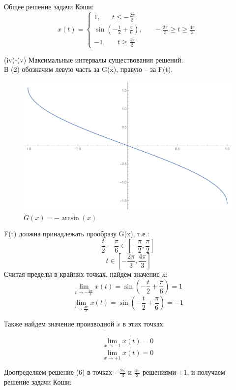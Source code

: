 \documentclass[a4paper, 12pt]{article}
\begin{document}
Общее решение задачи Коши:
\begin{equation*}
x(t) = 
 \begin{cases}
    1, \;\;\;\;\;\; t\leq -\frac{2\pi}3\\
   \sin( -\frac t 2 + \frac {\pi}{6}), \;\;\;\;\;\;  -\frac{2\pi}3 \geq  t\geq \frac{4\pi}3\\
   -1, \;\;\;\;\;\; t\geq \frac{4\pi}3
 \end{cases}
\end{equation*}



(iv)-(v) Максимальные интервалы существования решений.\\
В (2) обозначим левую часть за G(x), правую -- за F(t).
 
\begin{figure}[H]
	\centering
	\includegraphics[scale=0.6]{6}
	\caption{$G(x)=-\arcsin(x)$}
\end{figure}
F(t) должна принадлежать прообразу G(x), т.е.:
\[\frac t 2 - \frac{\pi} 6 \in \left[-\frac{\pi} 2 , \frac{\pi} 2  \right] \]
\[\ t  \in \left[-\frac{2\pi}3 , \frac{4\pi} 3  \right] \]
Считая пределы в крайних точках, найдем значение x:
\[\lim_{t \rightarrow -\frac{2\pi}3} x(t) = \sin\left( -\frac t 2 + \frac {\pi}{6}\right) = 1\]
\[\lim_{t  \rightarrow \frac{4\pi}3} x(t) = \sin\left( -\frac t 2 + \frac {\pi}{6}\right) = -1\]

Также найдем значение производной $\dot{x}$ в этих точках:

\[\lim_{x \rightarrow -1}\dot{x(t)} = 0\]
\[\lim_{x  \rightarrow + 1 }\dot{x(t)} = 0\]

Доопределяем решение (6) в точках $ -\frac{2\pi}3 $ и $ \frac{4\pi} 3 $ решениями $\pm 1$, и получаем решение задачи Коши:
\end{document}
